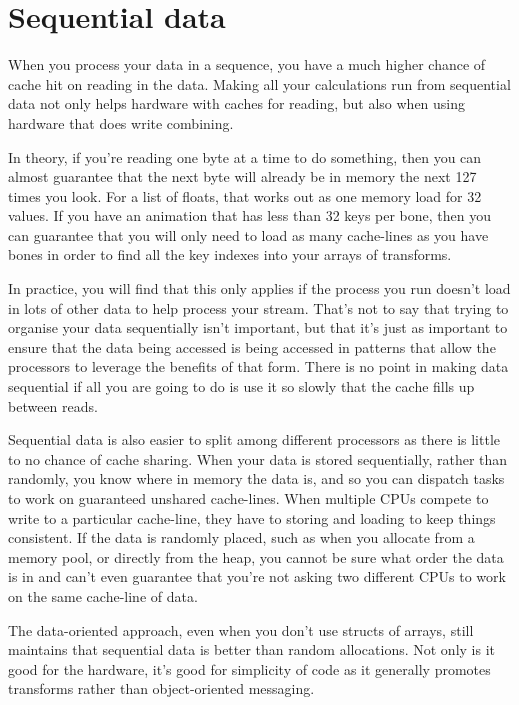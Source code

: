 \section{Sequential data}

When you process your data in a sequence, you have a much higher chance of
cache hit on reading in the data. Making all your calculations run from
sequential data not only helps hardware with caches for reading, but also when
using hardware that does write combining.

In theory, if you're reading one byte at a time to do something, then you can
almost guarantee that the next byte will already be in memory the next 127
times you look. For a list of floats, that works out as one memory load for 32
values. If you have an animation that has less than 32 keys per bone, then you
can guarantee that you will only need to load as many cache-lines as you have
bones in order to find all the key indexes into your arrays of transforms.

In practice, you will find that this only applies if the process you run
doesn't load in lots of other data to help process your stream. That's not to
say that trying to organise your data sequentially isn't important, but that
it's just as important to ensure that the data being accessed is being accessed
in patterns that allow the processors to leverage the benefits of that form.
There is no point in making data sequential if all you are going to do is use
it so slowly that the cache fills up between reads.

Sequential data is also easier to split among different processors as there is
little to no chance of cache sharing. When your data is stored sequentially,
rather than randomly, you know where in memory the data is, and so you can
dispatch tasks to work on guaranteed unshared cache-lines. When multiple CPUs
compete to write to a particular cache-line, they have to storing and loading
to keep things consistent. If the data is randomly placed, such as when you
allocate from a memory pool, or directly from the heap, you cannot be sure what
order the data is in and can't even guarantee that you're not asking two
different CPUs to work on the same cache-line of data.

The data-oriented approach, even when you don't use structs of arrays, still
maintains that sequential data is better than random allocations. Not only is
it good for the hardware, it's good for simplicity of code as it generally
promotes transforms rather than object-oriented messaging.


